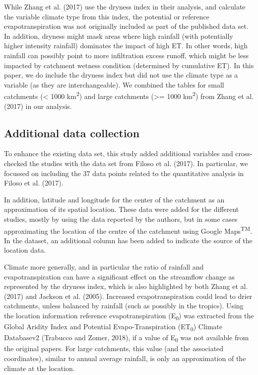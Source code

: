 \documentclass[]{elsarticle} %
\begin{document}
While Zhang et al. (2017) use the dryness index in their analysis, and calculate the variable climate type from this index, the potential or reference evapotranspiration was not originally included as part of the published data set. In addition, dryness might mask areas where high rainfall (with potentially higher intensity rainfall) dominates the impact of high ET. In other words, high rainfall can possibly point to more infiltration excess runoff, which might be less impacted by catchment wetness condition (determined by cumulative ET). In this paper, we do include the dryness index but did not use the climate type as a variable (as they are interchangeable).
We combined the tables for small catchments (\textless{} 1000 km\textsuperscript{2}) and large catchments (\textgreater= 1000 km\textsuperscript{2}) from Zhang et al. (2017) in our analysis.

\hypertarget{additional-data-collection}{%
\subsection{Additional data collection}\label{additional-data-collection}}

To enhance the existing data set, this study added additional variables and cross-checked the studies with the data set from Filoso et al. (2017). In particular, we focussed on including the 37 data points related to the quantitative analysis in Filoso et al. (2017).

In addition, latitude and longitude for the center of the catchment as an approximation of its spatial location. These data were added for the different studies, mostly by using the data reported by the authors, but in some cases approximating the location of the centre of the catchment using Google Maps\textsuperscript{TM}. In the dataset, an additional column has been added to indicate the source of the location data.

Climate more generally, and in particular the ratio of rainfall and evapotranspiration can have a significant effect on the streamflow change as represented by the dryness index, which is also highlighted by both Zhang et al. (2017) and Jackson et al. (2005). Increased evapotranspiration could lead to drier catchments, unless balanced by rainfall (such as possibly in the tropics). Using the location information reference evapotranspiration (E\textsubscript{0}) was extracted from the Global Aridity Index and Potential Evapo-Transpiration (ET\textsubscript{0}) Climate Databasev2 (Trabucco and Zomer, 2018), if a value of E\textsubscript{0} was not available from the original papers. For large catchments, this value (and the associated coordinates), similar to annual average rainfall, is only an approximation of the climate at the location.
\end{document}
